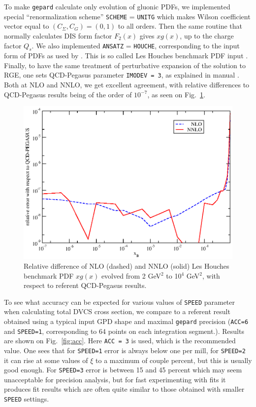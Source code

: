 \documentclass[12pt]{article}
\begin{document}
To make \texttt{gepard} calculate only evolution of gluonic PDFs, we implemented special
``renormalization scheme'' \texttt{SCHEME} = \texttt{UNITG} which
makes Wilson coefficient vector equal to $(C_{\Sigma}, C_G) = (0, 1)$
to all orders. Then the same routine that normally calculates DIS form factor
$F_2(x)$ gives $x g(x)$, up
to the charge factor $Q_s$. We also implemented \texttt{ANSATZ} = \texttt{HOUCHE}, corresponding to the
input form of PDFs as used by \cite{Vogt:2004ns}. This is so called Les Houches benchmark PDF
input \cite{Giele:2002hx}.  Finally, to have the same treatment of perturbative expansion of
the solution to RGE, one sets {\sc QCD-Pegasus} parameter \texttt{IMODEV = 3}, as explained in
manual \cite{Vogt:2004ns}. 
Both at NLO and NNLO, we get excellent agreement, with relative differences to
{\sc QCD-Pegasus} results being of the order of $10^{-7}$, as seen on
Fig.~\ref{fig:PDFevol}.


\begin{figure}
\begin{center}
\includegraphics[scale=0.8]{PDFevol}
\end{center}
\caption{Relative difference of NLO (dashed) and NNLO (solid) Les Houches benchmark PDF $x g(x)$
evolved from 2 GeV$^2$ to 10$^4$ GeV$^2$, with respect to referent {\sc QCD-Pegasus} 
\cite{Vogt:2004ns} results.}
\label{fig:PDFevol}
\end{figure}

To see what accuracy can be expected for various values of \texttt{SPEED} parameter 
when calculating total
DVCS cross section, we compare to a referent result obtained using a typical input GPD shape and
maximal \texttt{gepard} precision (\texttt{ACC=6} and \texttt{SPEED=1}, corresponding to
64 points on each integration segment.). Results are shown on
Fig.~\ref{fig:acc}. Here \texttt{ACC = 3} is used, which is the recommended value.
One sees that for  \texttt{SPEED=1} error is always below one per mill, for
\texttt{SPEED=2} it can rise at some values of $\xi$ to a maximum of couple percent, 
but this is usually good
enough. For \texttt{SPEED=3} error is between 15 and 45 percent which may seem
unacceptable for precision analysis, but for fast experimenting with fits it
produces fit results which are often quite similar to those obtained with
smaller \texttt{SPEED} settings.
\end{document}
